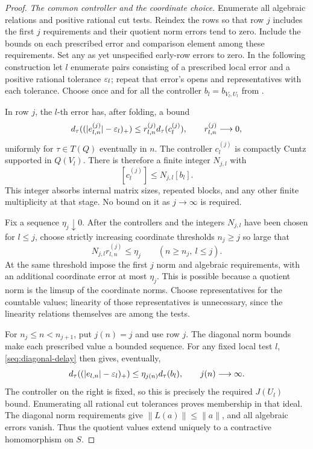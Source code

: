 \begin{proof}
\emph{The common controller and the coordinate choice.}
Enumerate all algebraic relations and positive rational cut tests.
Reindex the rows so that row \(j\) includes the first \(j\)
requirements and their quotient norm errors tend to zero.
Include the bounds on each prescribed error and comparison element
among these requirements.
Set any as yet unspecified early-row errors to zero.
In the following construction let \(l\) enumerate pairs consisting
of a prescribed local error and a positive rational tolerance
\(\varepsilon_l\); repeat that error's opens and representatives with
each tolerance.
Choose once and for all the controller
\(b_l=b_{V_l,U_l}\) from .

In row \(j\), the \(l\)-th error has, after folding, a bound
\[
 d_\tau((|e^{(j)}_{l,n}|-\varepsilon_l)_+)
 \leq r^{(j)}_{l,n}d_\tau(c^{(j)}_l),
 \qquad r^{(j)}_{l,n}\longrightarrow0,
\]
uniformly for \(\tau\in T(Q)\) eventually in \(n\).
The controller \(c^{(j)}_l\) is compactly Cuntz supported in
\(Q(V_l)\). There is therefore a finite integer \(N_{j,l}\) with
\[
 [c^{(j)}_l]\leq N_{j,l}[b_l].
\]
This integer absorbs internal matrix sizes, repeated blocks, and
any other finite multiplicity at that stage. No bound on it as
\(j\to\infty\) is required.

Fix a sequence \(\eta_j\downarrow0\). After the controllers and
the integers \(N_{j,l}\) have been chosen for \(l\leq j\),
choose strictly increasing coordinate thresholds \(n_j\geq j\)
so large that
\begin{equation}\label{seq:diagonal-delay}
 N_{j,l}r^{(j)}_{l,n}\leq\eta_j
 \qquad(n\geq n_j,\ l\leq j).
\end{equation}
At the same threshold impose the first \(j\) norm and algebraic
requirements, with an additional coordinate error at most
\(\eta_j\). This is possible because a quotient norm is the
limsup of the coordinate norms. Choose representatives for the
countable values; linearity of those representatives is unnecessary,
since the linearity relations themselves are among the tests.

For \(n_j\leq n<n_{j+1}\), put \(j(n)=j\) and use row \(j\).
The diagonal norm bounds make each prescribed value a bounded
sequence. For any fixed local
test \(l\), \eqref{seq:diagonal-delay} then gives, eventually,
\[
 d_\tau((|e_{l,n}|-\varepsilon_l)_+)
 \leq\eta_{j(n)}d_\tau(b_l),
 \qquad j(n)\longrightarrow\infty.
\]
The controller on the right is fixed, so this is precisely the
required \(J(U_l)\) bound. Enumerating all rational cut
tolerances proves membership in that ideal. The diagonal norm
requirements give \(\|L(a)\|\leq\|a\|\), and all algebraic
errors vanish. Thus the quotient values extend uniquely to a
contractive homomorphism on \(S\).


\end{proof}

